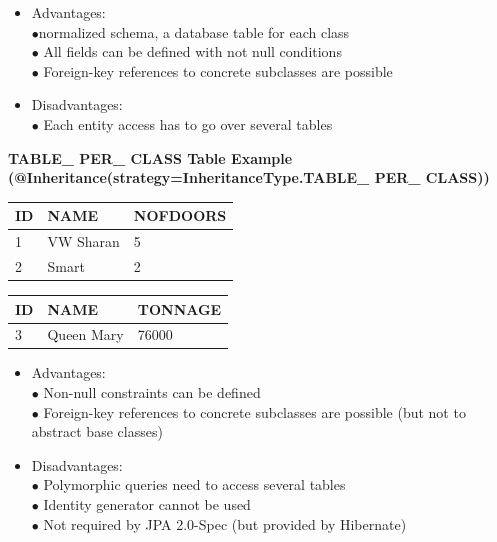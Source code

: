 \documentclass[10pt]{scrartcl}
\newcommand{\Bold}[1]{\textbf{#1}} %
\begin{document}
\begin{itemize}
\item Advantages:\\
$\bullet$normalized schema, a database table for each class\\
$\bullet$ All fields can be defined with not null conditions\\
$\bullet$ Foreign-key references to concrete subclasses are possible
\item Disadvantages:\\
$\bullet$ Each entity access has to go over several tables
\end{itemize}
\Bold{TABLE\_ PER\_ CLASS Table Example (@Inheritance(strategy=InheritanceType.TABLE\_ PER\_ CLASS))}\\
\begin{tabular}{|l|l|l|}
\hline
ID&NAME&NOFDOORS\\\hline
1&VW Sharan&5\\\hline
2&Smart&2\\\hline
\end{tabular}
\hspace*{1cm}
\begin{tabular}{|l|l|l|}
\hline
ID&NAME&TONNAGE\\\hline
3&Queen Mary&76000\\\hline
\end{tabular}
\begin{itemize}
\item Advantages:\\
$\bullet$ Non-null constraints can be defined\\
$\bullet$ Foreign-key references to concrete subclasses are possible (but not to abstract base classes)
\item Disadvantages:\\
$\bullet$ Polymorphic queries need to access several tables\\
$\bullet$ Identity generator cannot be used\\
$\bullet$ Not required by JPA 2.0-Spec (but provided by Hibernate)
\end{itemize}
\end{document}
